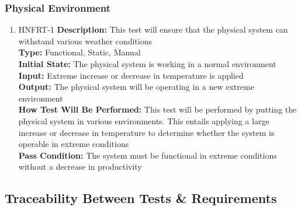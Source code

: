 \documentclass[12pt, titlepage]{article}
\begin{document}
\subsubsection{Physical Environment}
\begin{enumerate}
    \item{HNFRT-1}
    \textbf{Description:} This test will ensure that the physical system can withstand various weather conditions\\
    \textbf{Type:} Functional, Static, Manual\\
    \textbf{Initial State:} The physical system is working in a normal environment\\
    \textbf{Input:} Extreme increase or decrease in temperature is applied\\
    \textbf{Output:} The physical system will be operating in a new extreme environment\\
    \textbf{How Test Will Be Performed:} This test will be performed by putting the physical system in various environments. This entails applying a large increase or decrease in temperature to determine whether the system is operable in extreme conditions\\
    \textbf{Pass Condition:} The system must be functional in extreme conditions without a decrease in productivity\\
\end{enumerate}

\subsection{Traceability Between Tests \& Requirements}
\end{document}
